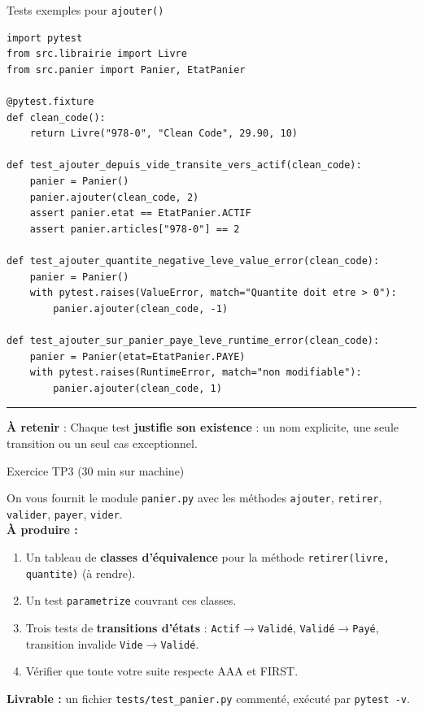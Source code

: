 \documentclass[aspectratio=169,11pt]{beamer}
\newcommand{\takeaway}[1]{%
\vfill\begin{beamercolorbox}[wd=\linewidth,sep=0.4em]{}
\color{accent2}\rule[0.6ex]{1.2em}{1.2pt}\hspace{0.4em}%
\textbf{\color{accent2}\small À retenir} \textcolor{textsoft}{:} %
{\small\color{textmain}#1}
\end{beamercolorbox}}
\begin{document}
\begin{frame}[fragile,t,shrink=15]{Tests exemples pour \texttt{ajouter()}}
\begin{lstlisting}[style=pythondark]
import pytest
from src.librairie import Livre
from src.panier import Panier, EtatPanier

@pytest.fixture
def clean_code():
    return Livre("978-0", "Clean Code", 29.90, 10)

def test_ajouter_depuis_vide_transite_vers_actif(clean_code):
    panier = Panier()
    panier.ajouter(clean_code, 2)
    assert panier.etat == EtatPanier.ACTIF
    assert panier.articles["978-0"] == 2

def test_ajouter_quantite_negative_leve_value_error(clean_code):
    panier = Panier()
    with pytest.raises(ValueError, match="Quantite doit etre > 0"):
        panier.ajouter(clean_code, -1)

def test_ajouter_sur_panier_paye_leve_runtime_error(clean_code):
    panier = Panier(etat=EtatPanier.PAYE)
    with pytest.raises(RuntimeError, match="non modifiable"):
        panier.ajouter(clean_code, 1)
\end{lstlisting}
\takeaway{Chaque test \textbf{justifie son existence} : un nom explicite, une seule transition ou un seul cas exceptionnel.}
\end{frame}

\begin{frame}[t,shrink=10]{Exercice TP3 (30 min sur machine)}
\begin{exercice}
On vous fournit le module \texttt{panier.py} avec les méthodes \texttt{ajouter}, \texttt{retirer}, \texttt{valider}, \texttt{payer}, \texttt{vider}.\\[0.5em]
\textbf{À produire :}
\begin{enumerate}\itemsep0.1em
\item Un tableau de \textbf{classes d'équivalence} pour la méthode \texttt{retirer(livre, quantite)} (à rendre).
\item Un test \texttt{parametrize} couvrant ces classes.
\item Trois tests de \textbf{transitions d'états} : \texttt{Actif$\to$Validé}, \texttt{Validé$\to$Payé}, transition invalide \texttt{Vide$\to$Validé}.
\item Vérifier que toute votre suite respecte AAA et FIRST.
\end{enumerate}
\vspace{0.4em}
\textbf{Livrable :} un fichier \texttt{tests/test\_panier.py} commenté, exécuté par \texttt{pytest -v}.
\end{exercice}
\end{frame}
\end{document}

